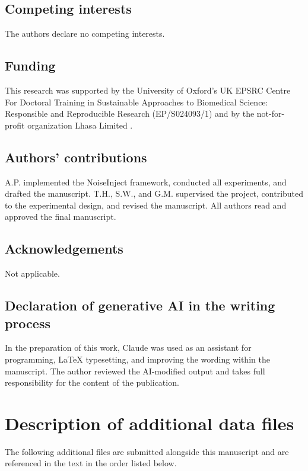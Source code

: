 \documentclass[pdflatex,sn-basic]{sn-jnl}%
\theoremstyle{thmstyleone}%
\theoremstyle{thmstyletwo}%
\theoremstyle{thmstylethree}%
\begin{document}
\subsection*{Competing interests}

The authors declare no competing interests.

\subsection*{Funding}

This research was supported by the University of Oxford's UK EPSRC Centre For Doctoral Training in Sustainable Approaches to Biomedical Science: Responsible and Reproducible Research (EP/S024093/1) and by the not-for-profit organization Lhasa Limited \citep{lhasa}.

\subsection*{Authors' contributions}

A.P. implemented the NoiseInject framework, conducted all experiments, and drafted the manuscript. T.H., S.W., and G.M. supervised the project, contributed to the experimental design, and revised the manuscript. All authors read and approved the final manuscript.

\subsection*{Acknowledgements}

Not applicable.

\subsection*{Declaration of generative AI in the writing process}
In the preparation of this work, Claude was used as an assistant for programming, LaTeX typesetting, and improving the wording within the manuscript. The author reviewed the AI-modified output and takes full responsibility for the content of the publication. 

\section*{Description of additional data files}

The following additional files are submitted alongside this manuscript and are referenced in the text in the order listed below.
\end{document}
